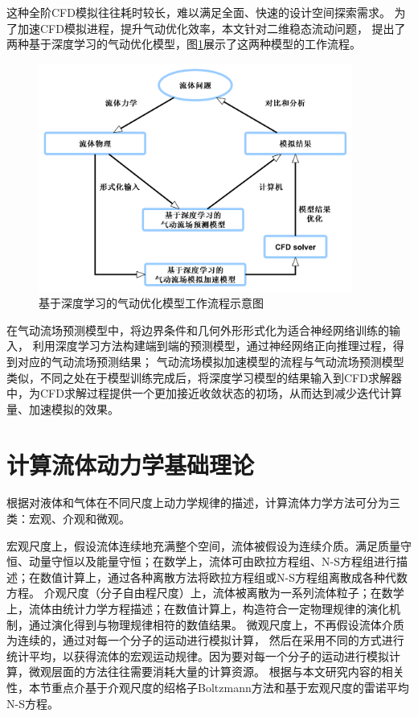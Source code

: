 这种全阶CFD模拟往往耗时较长，难以满足全面、快速的设计空间探索需求。
为了加速CFD模拟进程，提升气动优化效率，本文针对二维稳态流动问题，
提出了两种基于深度学习的气动优化模型，图\ref{fig:cfd_dnnflow}展示了这两种模型的工作流程。

\begin{figure}[htp]
	\centering
	\includegraphics[width=0.92\textwidth]{figures/cfd_dnnflow.pdf}
	\caption{基于深度学习的气动优化模型工作流程示意图}
	\label{fig:cfd_dnnflow}
\end{figure}

在气动流场预测模型中，将边界条件和几何外形形式化为适合神经网络训练的输入，
利用深度学习方法构建端到端的预测模型，通过神经网络正向推理过程，得到对应的气动流场预测结果；
气动流场模拟加速模型的流程与气动流场预测模型类似，不同之处在于模型训练完成后，将深度学习模型的结果输入到CFD求解器中，为CFD求解过程提供一个更加接近收敛状态的初场，从而达到减少迭代计算量、加速模拟的效果。



\section{计算流体动力学基础理论}
根据对液体和气体在不同尺度上动力学规律的描述，计算流体力学方法可分为三类：宏观、介观和微观。

宏观尺度上，假设流体连续地充满整个空间，流体被假设为连续介质。满足质量守恒、动量守恒以及能量守恒；在数学上，流体可由欧拉方程组、N-S方程组进行描述；在数值计算上，通过各种离散方法将欧拉方程组或N-S方程组离散成各种代数方程。
介观尺度（分子自由程尺度）上，流体被离散为一系列流体粒子；在数学上，流体由统计力学方程描述；在数值计算上，构造符合一定物理规律的演化机制，通过演化得到与物理规律相符的数值结果。
微观尺度上，不再假设流体介质为连续的，通过对每一个分子的运动进行模拟计算，
然后在采用不同的方式进行统计平均，以获得流体的宏观运动规律。因为要对每一个分子的运动进行模拟计算，微观层面的方法往往需要消耗大量的计算资源。
根据与本文研究内容的相关性，本节重点介基于介观尺度的绍格子Boltzmann方法和基于宏观尺度的雷诺平均N-S方程。



